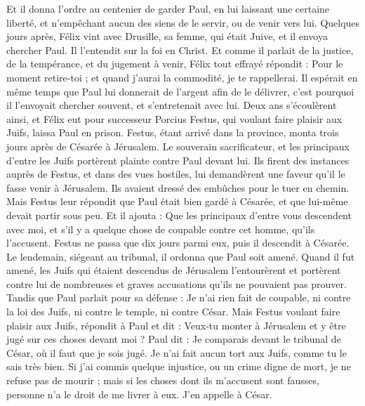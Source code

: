 \begin{multicols}{2}
Et il donna l’ordre au centenier de garder Paul, en lui laissant une certaine liberté, et n'empêchant aucun des siens de le servir, ou de venir vers lui.
Quelques jours après, Félix vint avec Drusille, sa femme, qui était Juive, et il envoya chercher Paul. Il l’entendit sur la foi en Christ.
Et comme il parlait de la justice, de la tempérance, et du jugement à venir, Félix tout effrayé répondit : Pour le moment retire-toi ; et quand j'aurai la commodité, je te rappellerai.
Il espérait en même temps que Paul lui donnerait de l’argent afin de le délivrer, c'est pourquoi il l'envoyait chercher souvent, et s'entretenait avec lui.
Deux ans s’écoulèrent ainsi, et Félix eut pour successeur Porcius Festus, qui voulant faire plaisir aux Juifs, laissa Paul en prison.
\VerseOne{}Festus, étant arrivé dans la province, monta trois jours après de Césarée à Jérusalem.
Le souverain sacrificateur, et les principaux d'entre les Juifs portèrent plainte contre Paul devant lui. Ils firent des instances auprès de Festus, et dans des vues hostiles,
lui demandèrent une faveur qu’il le fasse venir à Jérusalem. Ils avaient dressé des embûches pour le tuer en chemin.
Mais Festus leur répondit que Paul était bien gardé à Césarée, et que lui-même devait partir sous peu.
Et il ajouta : Que les principaux d’entre vous descendent avec moi, et s’il y a quelque chose de coupable contre cet homme, qu’ils l’accusent.
Festus ne passa que dix jours parmi eux, puis il descendit à Césarée. Le lendemain, siégeant au tribunal, il ordonna que Paul soit amené.
Quand il fut amené, les Juifs qui étaient descendus de Jérusalem l’entourèrent et portèrent contre lui de nombreuses et graves accusations qu’ils ne pouvaient pas prouver.
Tandis que Paul parlait pour sa défense : Je n’ai rien fait de coupable, ni contre la loi des Juifs, ni contre le temple, ni contre César.
Mais Festus voulant faire plaisir aux Juifs, répondit à Paul et dit : Veux-tu monter à Jérusalem et y être jugé sur ces choses devant moi ?
Paul dit : Je comparais devant le tribunal de César, où il faut que je sois jugé. Je n'ai fait aucun tort aux Juifs, comme tu le sais très bien.
Si j’ai commis quelque injustice, ou un crime digne de mort, je ne refuse pas de mourir ; mais si les choses dont ils m’accusent sont fausses, personne n’a le droit de me livrer à eux. J’en appelle à César.

\end{multicols}
